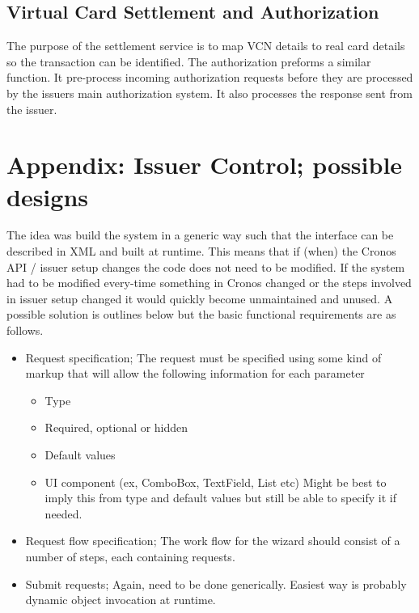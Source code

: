 \documentclass[a4paper, 11pt, titlepage]{article}
\begin{document}
\subsection{Virtual Card Settlement and Authorization} 
The purpose of the settlement service is to map VCN details to real card details so the transaction can be identified.
The authorization preforms a similar function. It pre-process incoming authorization requests before they are processed by the issuers main authorization system. It also processes the response sent from the issuer.
 
 
\cite{Orbiscom_Arch} 

\newpage 


\label{issuer_control}
\section{Appendix: Issuer Control; possible designs}
The idea was build the system in a generic way such that the interface can be described in XML and built at runtime. This means that if (when) the Cronos API / issuer setup changes the code does not need to be modified. If the system had to be modified every-time something in Cronos changed or the steps involved in issuer setup changed it would quickly become unmaintained and unused.  A possible solution is outlines below but the basic functional requirements are as follows.
\begin{itemize}
\item Request specification; The request must be specified using some kind of markup that will allow the following information for each parameter \label{section:required metadata}
	\begin{itemize}
	\item Type
	\item Required, optional or hidden
	\item Default values
	\item UI component (ex, ComboBox, TextField, List etc) Might be best to imply this from type and default values but still be able to specify it if needed.
	\end{itemize}
\item Request flow specification; The work flow for the wizard should consist of a number of steps, each containing requests.
\item Submit requests; Again, need to be done generically. Easiest way is probably dynamic object invocation at runtime.
\end{itemize}
\end{document}

